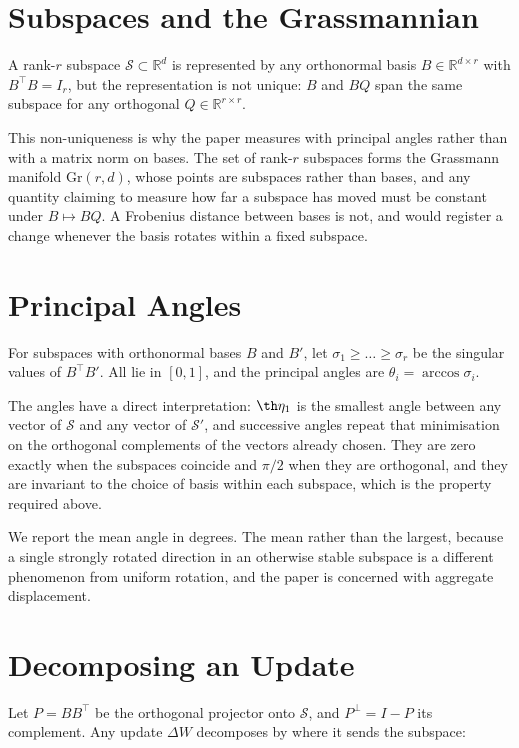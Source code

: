\documentclass{article}
\begin{document}
\section{Subspaces and the Grassmannian}


A rank-$r$ subspace $\mathcal{S} \subset \mathbb{R}^{d}$ is represented by any orthonormal basis $B \in \mathbb{R}^{d \times r}$ with $B^{\top}B = I_r$, but the representation is not unique: $B$ and $BQ$ span the same subspace for any orthogonal $Q \in \mathbb{R}^{r \times r}$.

This non-uniqueness is why the paper measures with principal angles rather than with a matrix norm on bases. The set of rank-$r$ subspaces forms the Grassmann manifold $\mathrm{Gr}(r, d)$, whose points are subspaces rather than bases, and any quantity claiming to measure how far a subspace has moved must be constant under $B \mapsto BQ$. A Frobenius distance between bases is not, and would register a change whenever the basis rotates within a fixed subspace.


\section{Principal Angles}


For subspaces with orthonormal bases $B$ and $B'$, let $\sigma_1 \ge \dots \ge \sigma_r$ be the singular values of $B^{\top}B'$. All lie in $[0, 1]$, and the principal angles are $\theta_i = \arccos \sigma_i$.

The angles have a direct interpretation: $\th\eta_1$ is the smallest angle between any vector of $\mathcal{S}$ and any vector of $\mathcal{S}'$, and successive angles repeat that minimisation on the orthogonal complements of the vectors already chosen. They are zero exactly when the subspaces coincide and $\pi/2$ when they are orthogonal, and they are invariant to the choice of basis within each subspace, which is the property required above.

We report the mean angle in degrees. The mean rather than the largest, because a single strongly rotated direction in an otherwise stable subspace is a different phenomenon from uniform rotation, and the paper is concerned with aggregate displacement.


\section{Decomposing an Update}


Let $P = BB^{\top}$ be the orthogonal projector onto $\mathcal{S}$, and $P^{\perp} = I - P$ its complement. Any update $\Delta W$ decomposes by where it sends the subspace:
\end{document}
